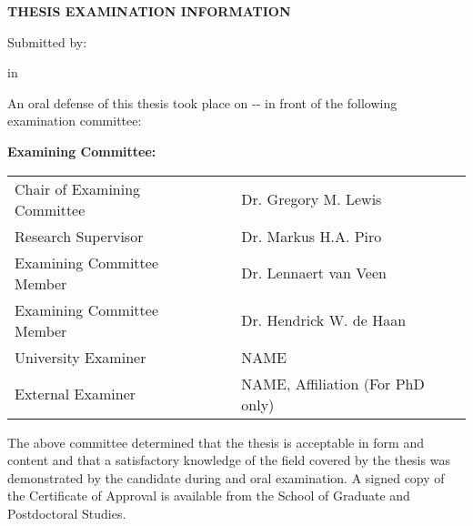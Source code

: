 
\cleardoublepage
\thispagestyle{plain}

\begin{center}
\textbf{THESIS EXAMINATION INFORMATION}

\bigskip

Submitted by:  \makeatletter\textbf{\@firstname\ {\@lastname}}\makeatother

\bigskip
\bigskip

\textbf{\degree} in \textbf{\program}

\end{center}


\bigskip
\bigskip

\noindent {}

\bigskip

An oral defense of this thesis took place on -\degreemonth-\degreeyear{} in front of the following examination committee:

\medskip

\noindent\textbf{Examining Committee:}

\bigskip

\begingroup
\renewcommand{\arraystretch}{2}
\begin{tabular}{lcl}
    Chair of Examining Committee &\phantom{Alphabet}& Dr. Gregory  M. Lewis\\
    Research Supervisor && Dr. Markus H.A. Piro\\
    Examining Committee Member && Dr. Lennaert van Veen \\
    Examining Committee Member && Dr. Hendrick W. de Haan \\
    University Examiner && NAME \\
    External Examiner && NAME, Affiliation (For PhD only)\\
\end{tabular}
\endgroup

\medskip

\noindent The above committee determined that the thesis is acceptable in form and content and that a satisfactory knowledge of the field covered by the thesis was demonstrated by the candidate during and oral examination. A signed copy of the Certificate of Approval is available from the School of Graduate and Postdoctoral Studies.
